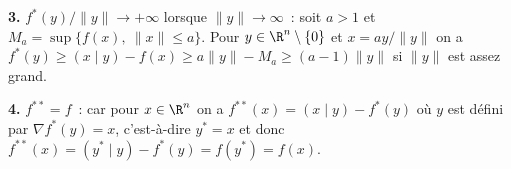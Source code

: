{{{\bf 3.} $f^*(y)/\|y\|\to +\infty$ lorsque $\|y\|\to\infty$~:
soit $a>1$ et $M_a = \sup\{f(x),\ \|x\|\le a\}$.
Pour $y\in\R^n\setminus\{0\}$ et $x=ay/\|y\|$ on a
$f^*(y) \ge (x\mid y) - f(x) \ge a\|y\|-M_a\ge (a-1)\|y\|$ si $\|y\|$ est assez grand.

{\bf 4.} $f^{**} = f$~: car pour $x\in\R^n$ on a $f^{**}(x) = (x\mid y) - f^*(y)$ où $y$ est
défini par $\nabla f^*(y) = x$, c'est-à-dire $y^* = x$ et donc
$f^{**}(x) = (y^*\mid y) - f^*(y) = f(y^*) = f(x)$.}
}
